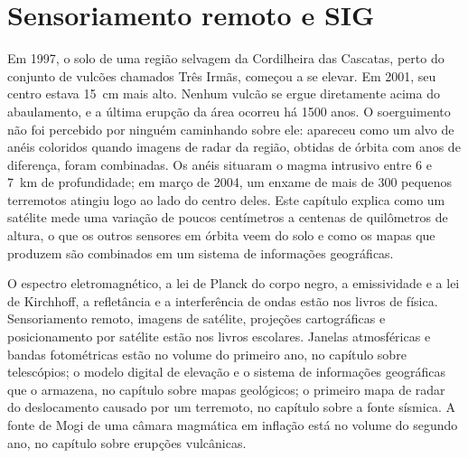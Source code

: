 \chapter{Sensoriamento remoto e SIG}\label{ch:b3:remote-sensing-gis}

Em 1997, o solo de uma região selvagem da Cordilheira das Cascatas, perto do conjunto de
vulcões chamados Três Irmãs, começou a se elevar. Em 2001, seu centro estava
\qty{15}{cm} mais alto. Nenhum vulcão se ergue diretamente acima do abaulamento, e a
última erupção da área ocorreu há 1500 anos. O soerguimento não foi percebido por
ninguém caminhando sobre ele: apareceu como um alvo de anéis coloridos quando
imagens de radar da região, obtidas de órbita com anos de diferença, foram combinadas.
Os anéis situaram o magma intrusivo entre 6 e \qty{7}{km} de profundidade; em março de 2004,
um enxame de mais de 300 pequenos terremotos atingiu logo ao lado do centro deles.
Este capítulo explica como um satélite mede uma variação de poucos
centímetros a centenas de quilômetros de altura, o que os outros sensores em órbita
veem do solo e como os mapas que produzem são combinados em um sistema de
informações geográficas.

\begin{recall}
O espectro eletromagnético, a lei de Planck do corpo negro, a emissividade
e a lei de Kirchhoff, a refletância e a interferência de ondas estão nos livros
de física. Sensoriamento remoto, imagens de satélite, projeções cartográficas e
posicionamento por satélite estão nos livros escolares. Janelas atmosféricas e
bandas fotométricas estão no volume do primeiro ano, no capítulo sobre telescópios;
o modelo digital de elevação e o sistema de informações geográficas que o
armazena, no capítulo sobre mapas geológicos; o primeiro mapa de radar do
deslocamento causado por um terremoto, no capítulo sobre a fonte sísmica. A fonte de Mogi
de uma câmara magmática em inflação está no volume do segundo ano, no capítulo sobre
erupções vulcânicas.
\end{recall}


